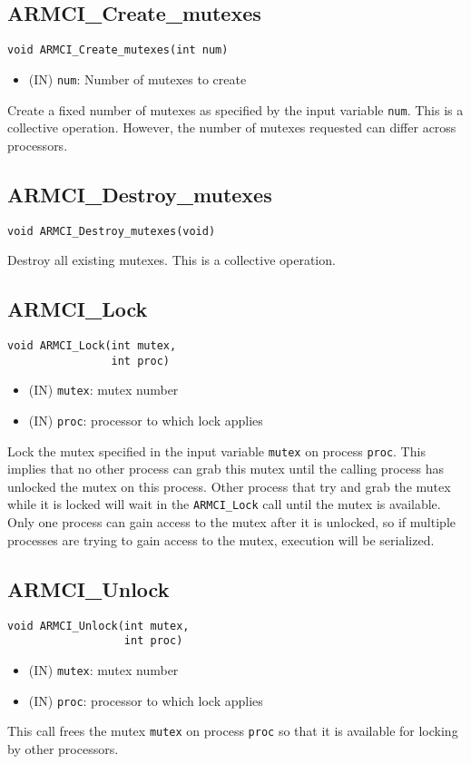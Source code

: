 \documentclass[12pt]{article}
\begin{document}
\subsection{ARMCI\_Create\_mutexes}
\begin{verbatim}
void ARMCI_Create_mutexes(int num)
\end{verbatim}
\begin{itemize}
\item (IN) \texttt{num}: Number of mutexes to create
\end{itemize}
Create a fixed number of mutexes as specified by the input variable
\texttt{num}. This is a collective operation. However, the number of mutexes
requested can differ across processors.

\subsection{ARMCI\_Destroy\_mutexes}
\begin{verbatim}
void ARMCI_Destroy_mutexes(void)
\end{verbatim}
Destroy all existing mutexes. This is a collective operation.

\subsection{ARMCI\_Lock}
\begin{verbatim}
void ARMCI_Lock(int mutex,
                int proc)
\end{verbatim}
\begin{itemize}
\item (IN) \texttt{mutex}: mutex number
\item (IN) \texttt{proc}: processor to which lock applies
\end{itemize}
Lock the mutex specified in the input variable \texttt{mutex} on process
\texttt{proc}. This implies that no other process can grab this mutex until the
calling process has unlocked the mutex on this process. Other process that try
and grab the mutex while it is locked will wait in the \texttt{ARMCI\_Lock} call until
the mutex is available. Only one process can gain access to the mutex after it
is unlocked, so if multiple processes are trying to gain access to the mutex,
execution will be serialized.

\subsection{ARMCI\_Unlock}
\begin{verbatim}
void ARMCI_Unlock(int mutex,
                  int proc)
\end{verbatim}
\begin{itemize}
\item (IN) \texttt{mutex}: mutex number
\item (IN) \texttt{proc}: processor to which lock applies
\end{itemize}
This call frees the mutex \texttt{mutex} on process \texttt{proc} so that it is
available for locking by other processors.
\end{document}
